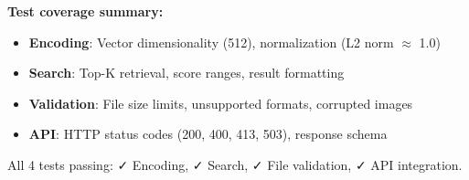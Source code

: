 \textbf{Test coverage summary:}
\begin{itemize}
    \item \textbf{Encoding}: Vector dimensionality (512), normalization (L2 norm $\approx$ 1.0)
    \item \textbf{Search}: Top-K retrieval, score ranges, result formatting
    \item \textbf{Validation}: File size limits, unsupported formats, corrupted images
    \item \textbf{API}: HTTP status codes (200, 400, 413, 503), response schema
\end{itemize}

All 4 tests passing: ✓ Encoding, ✓ Search, ✓ File validation, ✓ API integration.


